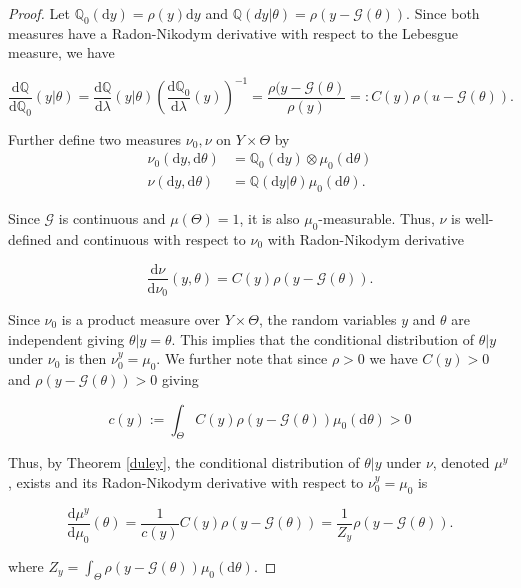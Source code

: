 \begin{proof}
  Let $\mathbb{Q}_0(\text{d}y) = \rho(y)\text{d}y$ and $\mathbb{Q}(dy|\theta) = \rho(y - \mathcal{G}(\theta))$. Since both measures have a Radon-Nikodym derivative with respect to the Lebesgue measure, we have

  \begin{equation*}
    \frac{\text{d}\mathbb{Q}}{\text{d}\mathbb{Q}_0}(y|\theta) = \frac{\text{d}\mathbb{Q}}{\text{d}\lambda}(y|\theta)\left(\frac{\text{d}\mathbb{Q}_0}{\text{d}\lambda}(y)\right)^{-1} = \frac{\rho(y - \mathcal{G}(\theta)}{\rho(y)} =: C(y)\rho(u - \mathcal{G}(\theta)).
  \end{equation*}

  Further define two measures $\nu_0, \nu$ on $Y \times \Theta$ by
  \begin{equation*}
    \begin{aligned}
      \nu_0(\text{d}y, \text{d}\theta) &= \mathbb{Q}_0(\text{d}y) \otimes \mu_0(\text{d}\theta)\\
      \nu(\text{d}y, \text{d}\theta) &= \mathbb{Q}(\text{d}y|\theta) \mu_0(\text{d}\theta).
    \end{aligned}
  \end{equation*}

  Since $\mathcal{G}$ is continuous and $\mu(\Theta) = 1$, it is also $\mu_0$-measurable. Thus, $\nu$ is well-defined and continuous with respect to $\nu_0$ with Radon-Nikodym derivative

  \begin{equation*}
    \frac{\text{d}\nu}{\text{d}\nu_0}(y, \theta) = C(y)\rho(y - \mathcal{G}(\theta)).
  \end{equation*}

  Since $\nu_0$ is a product measure over $Y \times \Theta$, the random variables $y$ and $\theta$ are independent giving $\theta|y = \theta$. This implies that the conditional distribution of $\theta|y$ under $\nu_0$ is then $\nu_0^y = \mu_0$. We further note that since $\rho > 0$ we have $C(y) > 0$ and $\rho(y - \mathcal{G}(\theta)) > 0$ giving

  \begin{equation*}
    c(y) := \int_\Theta C(y)\rho(y - \mathcal{G}(\theta))\mu_0(\text{d}\theta) > 0 
  \end{equation*}


  Thus, by Theorem \ref{duley}, the conditional distribution of $\theta|y$ under $\nu$, denoted $\mu^y$, exists and its Radon-Nikodym derivative with respect to $\nu_0^y = \mu_0$ is

  \begin{equation*}
    \frac{\text{d}\mu^y}{\text{d}\mu_0}(\theta) = \frac1{c(y)}C(y)\rho(y - \mathcal{G}(\theta)) =  \frac1{Z_y}\rho(y - \mathcal{G}(\theta)).
  \end{equation*}
  
  where $Z_y = \int_\Theta\rho(y - \mathcal{G}(\theta))\mu_0(\text{d}\theta)$.
\end{proof}

